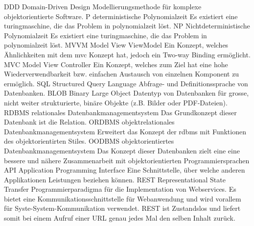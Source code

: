   {DDD}               %
  {Domain-Driven Design}  %
  {Modellierungsmethode für komplexe objektorientierte Software.}
  {P}               %
  {deterministische Polynomialzeit}  %
  {Es existiert eine  \gls{turingmaschine}, die das Problem in \gls{polynomialzeit} löst.}
  {NP}               %
  {Nichtdeterministische Polynomialzeit}  %
  {Es existiert eine  \gls{turingmaschine}, die das Problem in \gls{polynomialzeit} löst.}
  {MVVM}               %
  {Model View ViewModel}  %
  {Ein Konzept, welches Ähnlichkeiten mit dem \gls{mvc} Konzept hat, jedoch ein Two-way Binding ermöglicht.}
  {MVC}               %
  {Model View Controller}  %
  {Ein Konzept, welches zum Ziel hat eine hohe Wiederverwendbarkeit bzw. einfachen Austausch von einzelnen Komponent zu ermöglich.}  
  {SQL}               %
  {Structured Query Language}  %
  {Abfrage- und Definitionssprache von Datenbanken.}
  {BLOB}               %
  {Binary Large Object}  %
  {Datentyp von Datenbanken für grosse, nicht weiter strukturierte, binäre Objekte (z.B. Bilder oder PDF-Dateien).}
  {RDBMS}               %
  {relationales Datenbankmanagementsystem}  %
  {Das Grundkonzept dieser Datenbank ist die Relation.}
  {ORDBMS}               %
  {objektrelationales Datenbankmanagementsystem}  %
  {Erweitert das Konzept der \gls{rdbms} mit Funktionen des objektorientirten Stiles.}
  {OODBMS}               %
  {objektorientiertes Datenbankmanagementsystem}  %
  {Das Konzept dieser Datenbanken zielt eine eine bessere und nähere Zusammenarbeit mit objektorientierten Programmiersprachen}
  {API}               %
  {Application Programming Interface}
  {Eine Schnittstelle, über welche anderen Applikationen Leistungen beziehen können.}
  {REST}               %
  {Representational State Transfer}
  {Programmierparadigma für die Implementation von Webservices. Es bietet eine Kommunikationsschnittstelle für Webanwendung und 
wird vorallem für Syste-System-Kommunikation verwendet. REST ist Zustandslos und liefert somit bei einem Aufruf einer URL genau 
jedes Mal den selben Inhalt zurück.}
